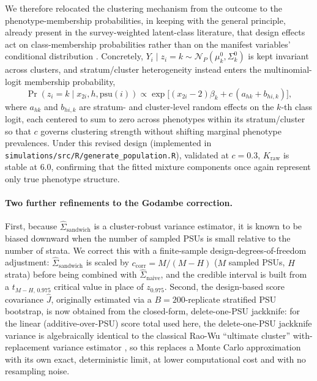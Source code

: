 \documentclass[11pt]{article}
\begin{document}
We therefore relocated the clustering mechanism from the outcome to the phenotype-membership probabilities, in keeping with the general principle, already present in the survey-weighted latent-class literature, that design effects act on class-membership probabilities rather than on the manifest variables' conditional distribution \citep{stephenson2024wolca,wu2024swolca}. Concretely, $Y_i \mid z_i = k \sim \mathcal N_P(\mu^0_k,\Sigma^0_k)$ is kept invariant across clusters, and stratum/cluster heterogeneity instead enters the multinomial-logit membership probability,
\begin{equation}
\Pr(z_i = k \mid x_{2i}, h, \text{psu}(i)) \propto \exp\!\big[(x_{2i}-2)\beta_k + c\,(a_{hk} + b_{hi,k})\big],
\end{equation}
where $a_{hk}$ and $b_{hi,k}$ are stratum- and cluster-level random effects on the $k$-th class logit, each centered to sum to zero across phenotypes within its stratum/cluster so that $c$ governs clustering strength without shifting marginal phenotype prevalences. Under this revised design (implemented in \texttt{simulations/src/R/generate\_population.R}), validated at $c=0.3$, $K_{\text{raw}}$ is stable at $6.0$, confirming that the fitted mixture components once again represent only true phenotype structure.

\paragraph{Two further refinements to the Godambe correction.} First, because $\hat\Sigma_{\text{sandwich}}$ is a cluster-robust variance estimator, it is known to be biased downward when the number of sampled PSUs is small relative to the number of strata. We correct this with a finite-sample design-degrees-of-freedom adjustment: $\hat\Sigma_{\text{sandwich}}$ is scaled by $c_{\text{corr}} = M/(M-H)$ ($M$ sampled PSUs, $H$ strata) before being combined with $\hat\Sigma_{\text{naive}}$, and the credible interval is built from a $t_{M-H,\,0.975}$ critical value in place of $z_{0.975}$. Second, the design-based score covariance $\hat J$, originally estimated via a $B=200$-replicate stratified PSU bootstrap, is now obtained from the closed-form, delete-one-PSU jackknife: for the linear (additive-over-PSU) score total used here, the delete-one-PSU jackknife variance is algebraically identical to the classical Rao-Wu ``ultimate cluster'' with-replacement variance estimator \citep{raowu1988resampling}, so this replaces a Monte Carlo approximation with its own exact, deterministic limit, at lower computational cost and with no resampling noise.
\end{document}
